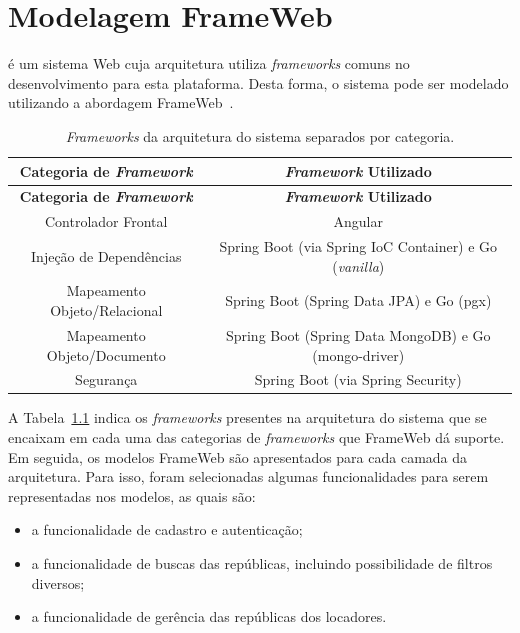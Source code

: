
\chapter{Modelagem FrameWeb}
\label{sec-frameweb}
\vspace{-1cm}

\emph{\imprimirtitulo} é um sistema Web cuja arquitetura utiliza \textit{frameworks} comuns no desenvolvimento para esta plataforma. Desta forma, o sistema pode ser modelado utilizando a abordagem FrameWeb~\cite{souza-celebratingfalbo20}.


\begin{footnotesize}
	\begin{longtable}{|c|c|}
		\caption{\textit{Frameworks} da arquitetura do sistema separados por categoria.}
		\label{tabela-frameworks}\\\hline
		
		\rowcolor{lightgray}
		\textbf{Categoria de \textit{Framework}} & \textbf{\textit{Framework} Utilizado} \\\hline 
		\endfirsthead
		\hline
		\rowcolor{lightgray}
		\textbf{Categoria de \textit{Framework}} & \textbf{\textit{Framework} Utilizado} \\\hline 
		\endhead

		Controlador Frontal & Angular \\\hline

		Injeção de Dependências & Spring Boot (via Spring IoC Container) e Go (\textit{vanilla}) \\\hline

		Mapeamento Objeto/Relacional & Spring Boot (Spring Data JPA) e Go (pgx) \\\hline

        Mapeamento Objeto/Documento & Spring Boot (Spring Data MongoDB) e Go (mongo-driver) \\\hline

		Segurança & Spring Boot (via Spring Security) \\\hline
	\end{longtable}
\end{footnotesize}

A Tabela~\ref{tabela-frameworks} indica os \textit{frameworks} presentes na arquitetura do sistema que se encaixam em cada uma das categorias de \textit{frameworks} que FrameWeb dá suporte. Em seguida, os modelos FrameWeb são apresentados para cada camada da arquitetura. Para isso, foram selecionadas algumas funcionalidades para serem representadas nos modelos, as quais são:
\begin{itemize}
    \item a funcionalidade de cadastro e autenticação;
    \item a funcionalidade de buscas das repúblicas, incluindo possibilidade de filtros diversos;
    \item a funcionalidade de gerência das repúblicas dos locadores.
\end{itemize}


